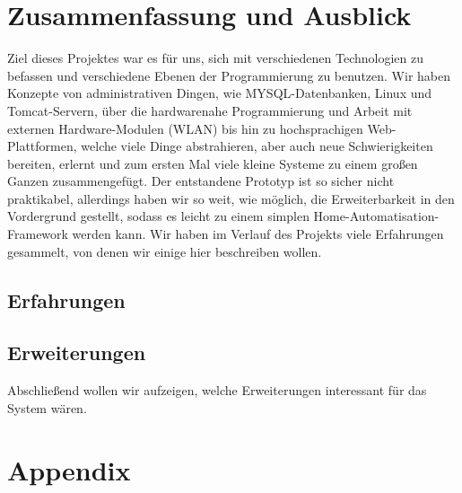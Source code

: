 \documentclass[12pt,a4paper,twoside]{article}
\newcommand{\labelSec}[1]{\label{sec:#1}}
\begin{document}
\section{Zusammenfassung und Ausblick} \labelSec{ausblick}
Ziel dieses Projektes war es für uns, sich mit verschiedenen Technologien zu befassen und verschiedene Ebenen der Programmierung zu benutzen. Wir haben Konzepte von administrativen Dingen, wie MYSQL-Datenbanken, Linux und Tomcat-Servern, über die hardwarenahe Programmierung und Arbeit mit externen Hardware-Modulen (WLAN) bis hin zu hochsprachigen Web-Plattformen, welche viele Dinge abstrahieren, aber auch neue Schwierigkeiten bereiten, erlernt und zum ersten Mal viele kleine Systeme zu einem großen Ganzen zusammengefügt. Der entstandene Prototyp ist so sicher nicht praktikabel, allerdings haben wir so weit, wie möglich, die Erweiterbarkeit in den Vordergrund gestellt, sodass es leicht zu einem simplen Home-Automatisation-Framework werden kann. Wir haben im Verlauf des Projekts viele Erfahrungen gesammelt, von denen wir einige hier beschreiben wollen.
\subsection{Erfahrungen}
\subsection{Erweiterungen}
Abschließend wollen wir aufzeigen, welche Erweiterungen interessant für das System wären. 

\clearpage

\section{Appendix}




\end{document}
